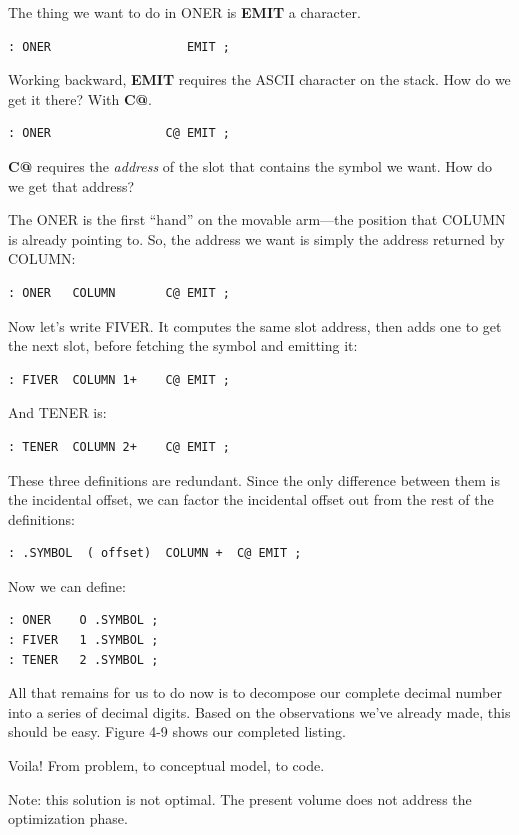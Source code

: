 The thing we want to do in ONER is \textbf{EMIT} a character.

\begin{verbatim}
: ONER                   EMIT ;
\end{verbatim}
Working backward, \textbf{EMIT} requires the ASCII character on the stack.
How do we get it there? With \textbf{C@}.

\begin{verbatim}
: ONER                C@ EMIT ;
\end{verbatim}
\textbf{C@} requires the \emph{address} of the slot that contains the symbol we
want. How do we get that address?

The ONER is the first ``hand'' on the movable arm---the position
that COLUMN is already pointing to. So, the address we want is simply
the address returned by COLUMN:

\begin{verbatim}
: ONER   COLUMN       C@ EMIT ;
\end{verbatim}
Now let's write FIVER. It computes the same slot address, then adds
one to get the next slot, before fetching the symbol and emitting it:

\begin{verbatim}
: FIVER  COLUMN 1+    C@ EMIT ;
\end{verbatim}
And TENER is:

\begin{verbatim}
: TENER  COLUMN 2+    C@ EMIT ;
\end{verbatim}
These three definitions are redundant. Since the only difference between
them is the incidental offset, we can factor the incidental offset out from
the rest of the definitions:

\begin{verbatim}
: .SYMBOL  ( offset)  COLUMN +  C@ EMIT ;
\end{verbatim}
Now we can define:

\begin{verbatim}
: ONER    O .SYMBOL ;
: FIVER   1 .SYMBOL ;
: TENER   2 .SYMBOL ;
\end{verbatim}
All that remains for us to do now is to decompose our complete decimal
number into a series of decimal digits. Based on the observations we've
already made, this should be easy. Figure 4-9 shows our completed
listing.

Voila! From problem, to conceptual model, to code.

Note: this solution is not optimal. The present volume does not address
the optimization phase.

